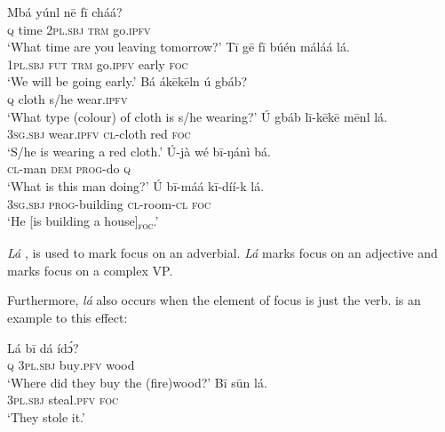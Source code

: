 \documentclass[output=paper,colorlinks,citecolor=brown]{langscibook}
\begin{document}
\ea%
    \label{ex:bisilki:26}
    \ea\label{ex:bisilki:26a}
        \ea\label{ex:bisilki:26ai}
        \gll    Mbá	yúnl	nē		fī	cháá?\\
                \textsc{q}	time	\textsc{2pl.sbj}	\textsc{trm}	go\textsc{.ipfv}\\
        \glt    ‘What time are you leaving tomorrow?’
        \ex\label{ex:bisilki:26aii}
        \gll    Tī		gē	fī	búén	máláá		lá.\\
                \textsc{1pl.sbj}	\textsc{fut}	\textsc{trm}	go\textsc{.ipfv}  early	\textsc{foc}\\
        \glt    ‘We will be going early.’
        \z
    \ex\label{ex:bisilki:26b}
        \ea\label{ex:bisilki:26bi}
        \gll    Bá	ákēkēln	ú	gbáb?\\
                \textsc{q}	cloth		s/he	wear\textsc{.ipfv}\\
        \glt    ‘What type (colour) of cloth is s/he wearing?’
        \ex\label{ex:bisilki:26bii}
        \gll    Ú	gbáb	lī-kēkē	mēnl		lá.\\
                \textsc{3sg.sbj}	wear\textsc{.ipfv}	\textsc{cl-}cloth	red	\textsc{foc}\\
        \glt    ‘S/he is wearing a red cloth.’
        \z
    \ex\label{ex:bisilki:26c}
        \ea\label{ex:bisilki:26ci}
        \gll    Ú-jà		wé	bī-ŋánì	bá.\\
                \textsc{cl-}man	\textsc{dem}	\textsc{prog-}do	\textsc{q}\\
        \glt    ‘What is this man doing?’
        \ex\label{ex:bisilki:26cii}
        \gll    Ú		bī-máá		kī-díí-k		lá.\\
                \textsc{3sg.sbj}	\textsc{prog-}building	\textsc{cl-}room\textsc{-cl}		\textsc{foc}\\
        \glt    ‘He [is building a house]\textsubscript{\textsc{foc}}.’
        \z
    
    \z
\z

\textit{Lá} , is used to mark focus on an adverbial. \textit{Lá} marks focus on an adjective and  marks focus on a complex VP.

Furthermore, \textit{lá} also occurs when the element of focus is just the verb.  is an example to this effect:

\ea%
    \label{ex:bisilki:27}
    \ea\label{ex:bisilki:27a}
    \gll    Lá	bī		dá		ídɔ́?\\
            \textsc{q}	\textsc{3pl.sbj}	buy\textsc{.pfv}	wood\\
    \glt    ‘Where did they buy the (fire)wood?’
    \ex\label{ex:bisilki:27b}
    \gll    Bī		sūn		lá.\\
            \textsc{3pl.sbj}	steal\textsc{.pfv}	\textsc{foc}\\
    \glt    ‘They stole it.’
    \z
\z
\end{document}
